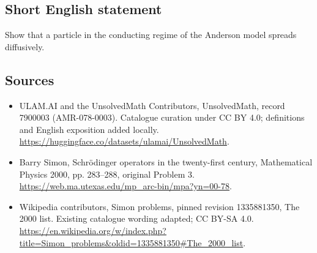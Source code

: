 \documentclass[11pt]{article}
\begin{document}
\subsection{Short English statement}
Show that a particle in the conducting regime of the Anderson model spreads diffusively.
\subsection{Sources}
\begin{itemize}
\item[\hypertarget{source:7900003:1}{S1}] ULAM.AI and the UnsolvedMath Contributors, UnsolvedMath, record 7900003 (AMR-078-0003). Catalogue curation under CC BY 4.0; definitions and English exposition added locally.
\url{https://huggingface.co/datasets/ulamai/UnsolvedMath}.
\item[\hypertarget{source:7900003:2}{S2}] Barry Simon, Schrödinger operators in the twenty-first century, Mathematical Physics 2000, pp. 283–288, original Problem 3.
\url{https://web.ma.utexas.edu/mp_arc-bin/mpa?yn=00-78}.
\item[\hypertarget{source:7900003:3}{S3}] Wikipedia contributors, Simon problems, pinned revision 1335881350, The 2000 list. Existing catalogue wording adapted; CC BY-SA 4.0.
\url{https://en.wikipedia.org/w/index.php?title=Simon_problems&oldid=1335881350#The_2000_list}.
\end{itemize}
\label{end:7900003}
\end{document}
